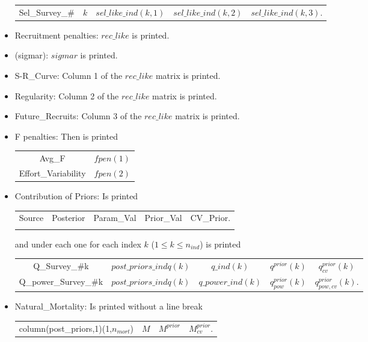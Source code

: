 \documentclass{article}
\begin{document}
\begin{itemize}
\begin{center}
\begin{tabular}{c c c c c}
           Sel\_Survey\_\#  &  $k$ & $sel\_like\_ind(k,1)$ & $sel\_like\_ind(k,2)$ & $sel\_like\_ind(k,3)$.\\
        \end{tabular}
    \end{center}
    \item Recruitment penalties: $rec\_like$ is printed.
    \item  (sigmar): $sigmar$ is printed.
    \item S-R\_Curve: Column 1 of the $rec\_like$ matrix is printed.
    \item Regularity:  Column 2 of the $rec\_like$ matrix is printed.
    \item Future\_Recruits: Column 3 of the $rec\_like$ matrix is printed.
    \item F penalties: Then is printed
    \begin{center}
        \begin{tabular}{c c}
          Avg\_F    &  $fpen(1)$\\
          Effort\_Variability  &  $fpen(2)$
        \end{tabular}
    \end{center}
    \item Contribution of Priors: Is printed
    \begin{center}
        \begin{tabular}{c c c c c}
           Source  &   Posterior &  Param\_Val & Prior\_Val &  CV\_Prior.\\
             & 
        \end{tabular}
    \end{center}
    and under each one for each index $k$ ($1\leq k \leq n_{ind}$) is printed
    \begin{center}
        \begin{tabular}{c c c c c}
         Q\_Survey\_\#k & $post\_priors\_indq(k)$ & $q\_ind(k)$ &  $q^{prior}(k)$ & $q^{prior}_{cv}(k)$ \\
         Q\_power\_Survey\_\#k    &  $post\_priors\_indq(k)$ & $q\_power\_ind(k)$ & $q_{pow}^{prior}(k)$ & $q_{pow,cv}^{prior}(k)$.
        \end{tabular}
    \end{center}
    \item Natural\_Mortality:  Is printed without a line break
    \begin{center}
        \begin{tabular}{c c c c} 
           column(post\_priors,1)(1,$n_{mort}$)  & $M$ & $M^{prior}$ & $M^{prior}_{cv}$.\\

\end{tabular}
\end{center}
\end{itemize}
\end{document}
